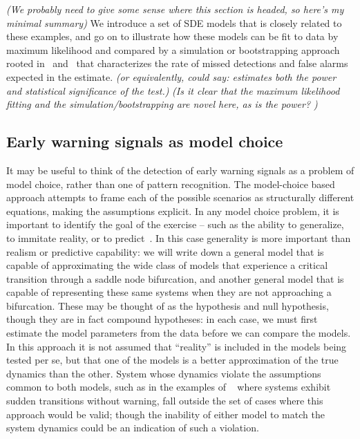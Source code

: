 \documentclass[authoryear,review,11pt]{elsarticle}
\newcommand{\cb}[1]{{\it (#1)}}
\begin{document}
\cb{We probably need to give some sense where this section is headed, so here's my minimal summary}
We introduce a set of SDE models that is closely related to these examples,
and go on to illustrate how these models can be fit to data by maximum likelihood
and compared by a simulation or bootstrapping approach rooted in~\citet{Cox1961} and~\citet{McLachlan1987} that
characterizes the rate of missed detections and false alarms expected in the estimate. 
\cb{or equivalently, could say: estimates both the power and statistical significance of the test.}  
\cb{Is it clear that the maximum likelihood fitting and the simulation/bootstrapping are novel here, as is the power? }



\subsection*{Early warning signals as model choice}
It may be useful to think of the detection of early warning signals as a problem of model choice, rather than one of pattern recognition.  
The model-choice based approach attempts to frame each of the possible scenarios as structurally different equations,
making the assumptions explicit.  
In any model choice problem, it is important to identify the goal of the exercise -- such as the ability to generalize, to immitate reality, or to predict~\citep{Levins1966}.  
In this case generality is more important than realism or predictive capability: 
we will write down a general model that is capable of approximating the wide class of models that experience a critical transition through a saddle node bifurcation,
and another general model that is capable of representing these same systems when they are not approaching a bifurcation.  
These may be thought of as the hypothesis and null hypothesis,
though they are in fact compound hypotheses: in each case, we must first estimate the model parameters from the data before we can compare the models.  
In this approach it is not assumed that ``reality'' is included in the models being tested per se, 
but that one of the models is a better approximation of the true dynamics than the other.  
System whose dynamics violate the assumptions common to both models, 
such as in the examples of ~\citet{Hastings2009} where systems exhibit sudden transitions without warning, 
fall outside the set of cases where this approach would be valid; 
though the inability of either model to match the system dynamics could be an indication of such a violation.  
\end{document}
